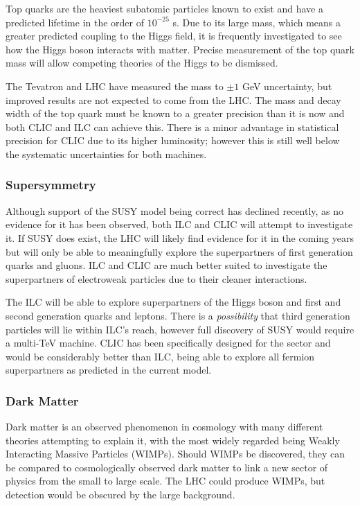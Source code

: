 Top quarks are the heaviest subatomic particles known to exist and have a predicted lifetime in the order of $10^{-25}$ s. Due to its large mass, which means a greater predicted coupling to the Higgs field, it is frequently investigated to see how the Higgs boson interacts with matter. Precise measurement of the top quark mass will allow competing theories of the Higgs to be dismissed.

The Tevatron and LHC have measured the mass to $\pm 1$ GeV uncertainty, but improved results are not expected to come from the LHC. The mass and decay width of the top quark must be known to a greater precision than it is now and both CLIC and ILC can achieve this. There is a minor advantage in statistical precision for CLIC due to its higher luminosity; however this is still well below the systematic uncertainties for both machines. \cite{CERN:TopQuark, CLIC:TopQuark}

\subsubsection{Supersymmetry}

Although support of the SUSY model being correct has declined recently, as no evidence for it has been observed, both ILC and CLIC will attempt to investigate it. If SUSY does exist, the LHC will likely find evidence for it in the coming years but will only be able to meaningfully explore the superpartners of first generation quarks and gluons. ILC and CLIC are much better suited to investigate the superpartners of electroweak particles due to their cleaner interactions.

The ILC will be able to explore superpartners of the Higgs boson and first and second generation quarks and leptons. There is a {\em possibility} that third generation particles will lie within ILC's reach, however full discovery of SUSY would require a multi-TeV machine. CLIC has been specifically designed for the sector and would be considerably better than ILC, being able to explore all fermion superpartners as predicted in the current model. \cite{CLIC:Concept}

\subsubsection{Dark Matter}

Dark matter is an observed phenomenon in cosmology with many different theories attempting to explain it, with the most widely regarded being Weakly Interacting Massive Particles (WIMPs). Should WIMPs be discovered, they can be compared to cosmologically observed dark matter to link a new sector of physics from the small to large scale. The LHC could produce WIMPs, but detection would be obscured by the large background.

